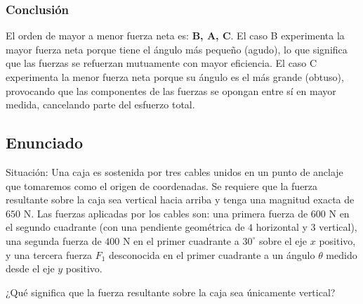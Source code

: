 \documentclass[12pt, a4paper]{article}
\begin{document}
\subsubsection*{Conclusión}
El orden de mayor a menor fuerza neta es: \textbf{B, A, C}.
El caso B experimenta la mayor fuerza neta porque tiene el ángulo más pequeño (agudo), lo que significa que las fuerzas se refuerzan mutuamente con mayor eficiencia. El caso C experimenta la menor fuerza neta porque su ángulo es el más grande (obtuso), provocando que las componentes de las fuerzas se opongan entre sí en mayor medida, cancelando parte del esfuerzo total.

\newpage

\subsection*{Enunciado}
Situación: Una caja es sostenida por tres cables unidos en un punto de anclaje que tomaremos como el origen de coordenadas. Se requiere que la fuerza resultante sobre la caja sea vertical hacia arriba y tenga una magnitud exacta de $650 \text{ N}$. Las fuerzas aplicadas por los cables son: una primera fuerza de $600 \text{ N}$ en el segundo cuadrante (con una pendiente geométrica de $4$ horizontal y $3$ vertical), una segunda fuerza de $400 \text{ N}$ en el primer cuadrante a $30^\circ$ sobre el eje $x$ positivo, y una tercera fuerza $F_1$ desconocida en el primer cuadrante a un ángulo $\theta$ medido desde el eje $y$ positivo.

\begin{center}
\end{center}

¿Qué significa que la fuerza resultante sobre la caja sea únicamente vertical?
\end{document}
